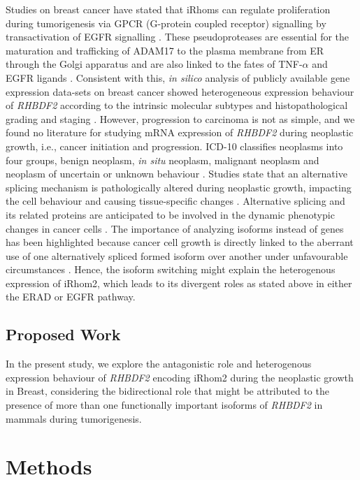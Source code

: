 \documentclass[fleqn,10pt,lineno]{wlpeerj}
\begin{document}
Studies on breast cancer have stated that iRhoms can regulate proliferation during tumorigenesis via GPCR (G-protein coupled receptor) signalling by transactivation of EGFR signalling \citep{Christova2013}. These pseudoproteases are essential for the maturation and trafficking of ADAM17 to the plasma membrane from ER through the Golgi apparatus and are also linked to the fates of TNF-$\alpha$ and EGFR ligands \citep{Lee2016}. Consistent with this, \textit{in silico} analysis of publicly available gene expression data-sets on breast cancer showed heterogeneous expression behaviour of \textit{RHBDF2} according to the intrinsic molecular subtypes and histopathological grading and staging \citep{Canzoneri2014}. However, progression to carcinoma is not as simple, and we found no literature for studying mRNA expression of \textit{RHBDF2} during neoplastic growth, i.e., cancer initiation and progression. ICD-10 classifies neoplasms into four groups, benign neoplasm, \textit{in situ} neoplasm, malignant neoplasm and neoplasm of uncertain or unknown behaviour  \citep{WHO2016}. Studies state that an alternative splicing mechanism is pathologically altered during neoplastic growth, impacting the cell behaviour and causing tissue-specific changes \citep{Lu2015,Chabot2016}. Alternative splicing and its related proteins are anticipated to be involved in the dynamic phenotypic changes in cancer cells \citep{Chabot2016}. The importance of analyzing isoforms instead of genes has been highlighted because cancer cell growth is directly linked to the aberrant use of one alternatively spliced formed isoform over another under unfavourable circumstances \citep{Soneson2020}. Hence, the isoform switching might explain the heterogenous expression of iRhom2, which leads to its divergent roles as stated above in either the ERAD or EGFR pathway.


\subsection*{Proposed Work}
In the present study, we explore the antagonistic role and heterogenous expression behaviour of \textit{RHBDF2} encoding iRhom2 during the neoplastic growth in Breast, considering the bidirectional role that might be attributed to the presence of more than one functionally important isoforms of \textit{RHBDF2} in mammals during tumorigenesis.

\section*{Methods}
\end{document}
